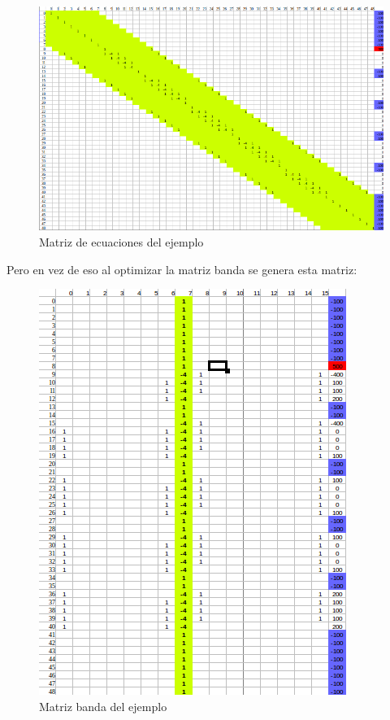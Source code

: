 \begin{figure}
\begin{center}
\includegraphics[scale=0.50]{imagenes/matrizej.png} 
\caption{Matriz de ecuaciones del ejemplo} 
\end{center}
\end{figure}



Pero en vez de eso al optimizar la matriz banda se genera esta matriz:

\begin{figure}
\begin{center}
\includegraphics[scale=0.70]{imagenes/matrizbandaej.png} 
\caption{Matriz banda del ejemplo} 
\end{center}
\end{figure}

